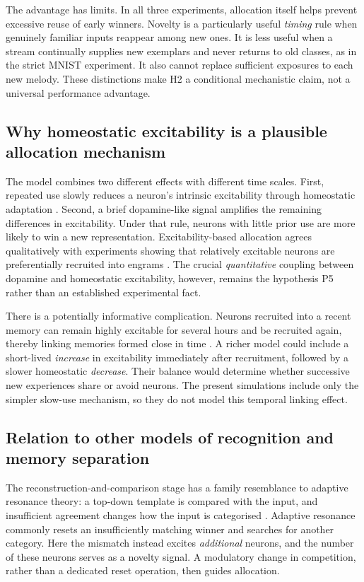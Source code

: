 \documentclass[11pt,a4paper]{article}
\begin{document}
The advantage has limits. In all three experiments, allocation itself helps prevent excessive reuse of early winners. Novelty is a particularly useful \emph{timing} rule when genuinely familiar inputs reappear among new ones. It is less useful when a stream continually supplies new exemplars and never returns to old classes, as in the strict MNIST experiment. It also cannot replace sufficient exposures to each new melody. These distinctions make H2 a conditional mechanistic claim, not a universal performance advantage.

\subsection{Why homeostatic excitability is a plausible allocation mechanism}
The model combines two different effects with different time scales. First, repeated use slowly reduces a neuron's intrinsic excitability through homeostatic adaptation \citep{desai1999,turrigiano2008}. Second, a brief dopamine-like signal amplifies the remaining differences in excitability. Under that rule, neurons with little prior use are more likely to win a new representation. Excitability-based allocation agrees qualitatively with experiments showing that relatively excitable neurons are preferentially recruited into engrams \citep{josselyn2018,yiu2014}. The crucial \emph{quantitative} coupling between dopamine and homeostatic excitability, however, remains the hypothesis P5 rather than an established experimental fact.

There is a potentially informative complication. Neurons recruited into a recent memory can remain highly excitable for several hours and be recruited again, thereby linking memories formed close in time \citep{josselyn2018}. A richer model could include a short-lived \emph{increase} in excitability immediately after recruitment, followed by a slower homeostatic \emph{decrease}. Their balance would determine whether successive new experiences share or avoid neurons. The present simulations include only the simpler slow-use mechanism, so they do not model this temporal linking effect.

\subsection{Relation to other models of recognition and memory separation}
The reconstruction-and-comparison stage has a family resemblance to adaptive resonance theory: a top-down template is compared with the input, and insufficient agreement changes how the input is categorised \citep{carpenter1987}. Adaptive resonance commonly resets an insufficiently matching winner and searches for another category. Here the mismatch instead excites \emph{additional} neurons, and the number of these neurons serves as a novelty signal. A modulatory change in competition, rather than a dedicated reset operation, then guides allocation.
\end{document}
